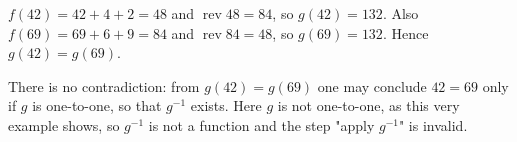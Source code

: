 $f(42)=42+4+2=48$ and $\operatorname{rev}48=84$, so $g(42)=132$. Also $f(69)=69+6+9=84$ and $\operatorname{rev}84=48$, so $g(69)=132$. Hence $g(42)=g(69)$.

There is no contradiction: from $g(42)=g(69)$ one may conclude $42=69$ only if $g$ is one-to-one, so that $g^{-1}$ exists. Here $g$ is not one-to-one, as this very example shows, so $g^{-1}$ is not a function and the step "apply $g^{-1}$" is invalid.
